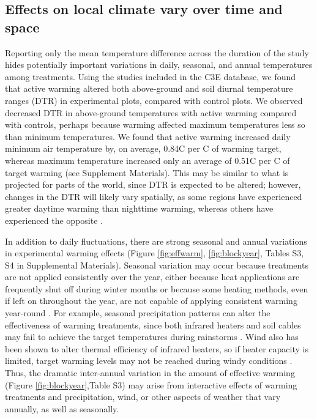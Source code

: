 \documentclass{article}
\begin{document}
\subsection* {Effects on local climate vary over time and space}
Reporting only the mean temperature difference across the duration of the study hides potentially important variations in daily, seasonal, and annual temperatures among treatments. Using the studies included in the C3E database, we found that active warming altered both above-ground and soil diurnal temperature ranges (DTR) in experimental plots, compared with control plots. We observed decreased DTR in above-ground temperatures with active warming compared with controls, perhaps because warming affected maximum temperatures less so than minimum temperatures. We found that active warming increased daily minimum air temperature by, on average, 0.84\degree C per \degree C of warming target, whereas maximum temperature increased only an average of 0.51\degree C per \degree C of target warming (see Supplement Materials). This may be similar to what is projected for parts of the world, since DTR is expected to be altered; however, changes in the DTR will likely vary spatially, as some regions have experienced greater daytime warming than nighttime warming, whereas others have experienced the opposite \citep{ipcc2013}. 
\par In addition to daily fluctuations, there are strong seasonal and annual variations in experimental warming effects (Figure \ref{fig:effwarm}, \ref{fig:blockyear}, Tables S3, S4 in Supplemental Materials). Seasonal variation may occur because treatments are not applied consistently over the year, either because heat applications are frequently shut off during winter months or because some heating methods, even if left on throughout the year, are not capable of applying consistent warming year-round \citep[e.g.][]{clark2014a,clark2014b,hagedorn2010}. For example, seasonal precipitation patterns can alter the effectiveness of warming treatments, since both infrared heaters and soil cables may fail to achieve the target temperatures during rainstorms \citep{peterjohn1993,hoeppner2012}. Wind also has been shown to alter thermal efficiency of infrared heaters, so if heater capacity is limited, target warming levels may not be reached during windy conditions \citep{kimball2005,kimball2008}. Thus, the dramatic inter-annual variation in the amount of effective warming (Figure \ref{fig:blockyear},Table S3) may arise from interactive effects of warming treatments and precipitation, wind, or other aspects of weather that vary annually, as well as seasonally. 
\end{document}
